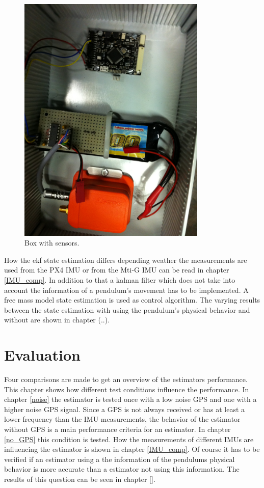 \begin{figure}[h]
\centering
\includegraphics[width=0.8\textwidth]{vicon_bilder/IMG_0130.jpg}
\caption{Box with sensors.}
\label{box_setup}
\end{figure}
How the ekf state estimation differs depending weather the measurements are used from the PX4 IMU or from the Mti-G IMU can be read in chapter \ref{IMU_comp}.
In addition to that a kalman filter which does not take into account the information of a pendulum's movement has to be implemented. A free mass model state estimation is used as control algorithm. The varying results between the state estimation with using the pendulum's physical behavior and without are shown in chapter (..).
\section{Evaluation}\label{evaluation}
Four comparisons are made to get an overview of the estimators performance. This chapter shows how different test conditions influence the performance. In chapter \ref{noise} the estimator is tested once with a low noise GPS and one with a higher noise GPS signal. Since a GPS is not always received or has at least a lower frequency than the IMU measurements, the behavior of the estimator without GPS is a main performance criteria for an estimator. In chapter \ref{no_GPS} this condition is tested. How the measurements of different IMUs are influencing the estimator is shown in chapter \ref{IMU_comp}. Of course it has to be verified if an estimator using a the information of the pendulums physical behavior is more accurate than a estimator not using this information. The results of this question can be seen in chapter \ref{}. 
